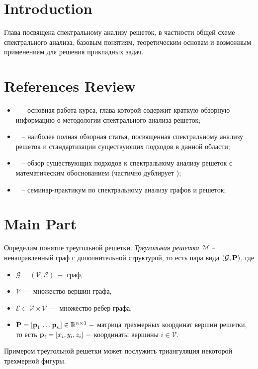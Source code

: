 \section{Introduction}

Глава посвящена спектральному анализу решеток, в частности общей схеме спектрального анализа, базовым понятиям, теоретическим основам и возможным применениям для решения прикладных задач.

\section{References Review}

\begin{itemize}
    \item ~\cite{GDL} -- основная работа курса, глава которой содержит краткую обзорную информацию о методологии спектрального анализа решеток;
    \item ~\cite{SpectralMeshSurvey} -- наиболее полная обзорная статья, посвященная спектральному анализу решеток и стандартизации существующих подходов в данной области;
    \item ~\cite{SpectralMeshSurvey2} -- обзор существующих подходов к спектральному анализу решеток с математическим обоснованием (частично дублирует \cite{SpectralMeshSurvey});
    \item ~\cite{SpectralMeshSurveyCourse} -- семинар-практикум по спектральному анализу графов и решеток;
\end{itemize}

\section{Main Part}

Определим понятие треугольной решетки. 
\textit{Треугольная решетка} $\mathcal{M}$ -- ненаправленный граф с дополнительной структурой, то есть пара вида $(\mathcal{G}, \textbf{P})$, где
	\begin{itemize} 
		\item $\mathcal{G} = (\mathcal{V}, \mathcal{E}) ~- $ граф, 
		\item $\mathcal{V} ~-$ множество вершин графа, 
		\item $\mathcal{E} \subset \mathcal{V} \times \mathcal{V} ~-$ множество ребер графа, 
		\item $\textbf{P} = \left[ \textbf{p}_1 \, \dots \textbf{p}_n \right] \in \mathbb{R}^{n \times 3} ~- $ матрица трехмерных координат вершин решетки, то есть
		$\textbf{p}_i = [x_i, y_i,z_i] ~-$ координаты вершины $i \in \mathcal{V}$. 
	\end{itemize}
Примером треугольной решетки может послужить триангуляция некоторой трехмерной фигуры.

